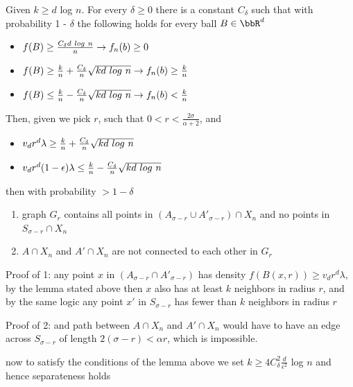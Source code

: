 Given $k \geq d$ log $n$.  For every $\delta \geq 0$ there is a constant $C_{\delta}$ such that with probability 1 - $\delta$ the following holds for every ball $B \in \bbR^d$

\begin{itemize}
  \item  $f(B) \geq \frac{C_{\delta} d \-\ log \-\ n}{n} \rightarrow f_n(b) \geq 0$
  \item $f(B) \geq \frac{k}{n} + \frac{C_{\delta}}{n}\sqrt{kd \-\ log \-\ n} \rightarrow f_n(b) \geq \frac{k}{n}$
  \item $f(B) \leq \frac{k}{n} - \frac{C_{\delta}}{n}\sqrt{kd \-\ log \-\ n} \rightarrow f_n(b) < \frac{k}{n}$
\end{itemize}


Then, given we pick $r$, such that $0 < r < \frac{2\sigma}{\alpha+2}$, and 
\begin{itemize}
  \item $v_dr^d\lambda \geq \frac{k}{n} + \frac{C_{\delta}}{n}\sqrt{kd \-\ log \-\ n}$
  \item $v_dr^d(1-\epsilon)\lambda \leq \frac{k}{n} - \frac{C_{\delta}}{n}\sqrt{kd \-\ log \-\ n}$
\end{itemize}
then with probability $> 1-\delta$

\begin{enumerate}
    \item \begin{lemma} graph $G_r$ contains all points in $(A_{\sigma-r} \cup A'_{\sigma-r}) \cap X_n$ and no points in $S_{\sigma - r } \cap X_n$
    \end{lemma}
    \item \begin{lemma} $A \cap X_n $ and $A' \cap X_n$ are not connected to each other in $G_r$
    \end{lemma}
\end{enumerate}

Proof of 1: any point $x$ in $(A_{\sigma-r} \cap A'_{\sigma - r})$ has density $f(B(x, r)) \geq v_dr^d\lambda$, by the lemma stated above then $x$ also has at least $k$ neighbors in radius $r$, and by the same logic any point $x'$ in $S_{\sigma-r}$ has fewer than $k$ neighbors in radius $r$

Proof of 2: and path between $A \cap X_n $ and $A' \cap X_n$ would have to have an edge across $S_{\sigma - r}$ of length $2(\sigma-r) < \alpha r$, which is impossible.

now to satisfy the conditions of the lemma above we set $k \geq 4C^2_{\delta}\frac{d}{\epsilon^2}$ log $n$ and hence separateness holds

